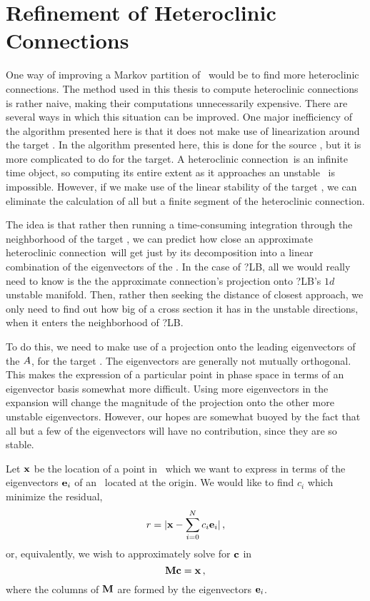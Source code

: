 \section{Refinement of Heteroclinic Connections}
One way of improving a Markov partition of \statesp\ would be to find
more heteroclinic connections.  The method used in this thesis to compute heteroclinic connections
is rather naive, making their computations unnecessarily expensive.  There
are several ways in which this situation can be improved.  One major inefficiency of
the algorithm presented here is that it does not make use of linearization
around the target \eqv.  In the algorithm presented
here, this is done for the source \eqv, but it is more complicated to
do for the target.  A heteroclinic connection\ is an infinite time object, so computing
its entire extent as it approaches an unstable \eqv\ is impossible.  However, if we make use
of the linear stability of the target \eqv, we can eliminate the calculation
of all but a finite segment of the heteroclinic connection.

The idea is that rather then running a time-consuming integration through
the neighborhood of the target \eqv, we can predict how close an approximate heteroclinic connection\
will get just by its decomposition into a linear combination of the eigenvectors of the \eqv.
In the case of ?LB, all we would really need to know is the
the approximate connection's projection onto ?LB's $1d$ unstable manifold.
Then, rather then seeking the distance of closest approach, we only need to find out how big
of a cross section it has in the unstable directions, when it enters
the neighborhood of ?LB.

To do this, we need to make use of a projection onto the leading eigenvectors
of the {\stabmat} $A$, for the target \eqv.  The eigenvectors are generally
not mutually orthogonal.  This makes the expression of a particular point
in phase space in terms of an eigenvector basis somewhat more difficult.
Using more eigenvectors in the expansion will change the magnitude
of the projection onto the other more unstable eigenvectors.
However, our hopes are somewhat buoyed by the fact that all but a few
of the eigenvectors will have no contribution, since they are so stable.

Let ${\bf x}$ be the location of a point in \statesp\ which we want
to express in terms of the eigenvectors ${\bf e}_i$ of an \eqv\ located
at the origin.
We would like to find $c_i$ which minimize the residual,
\begin{equation}
 r = |{{\bf x} - \sum_{i=0}^N c_i {\bf e}_i}|\,,
\end{equation}
or, equivalently, we wish to approximately solve for ${\bf c}$ in
\begin{equation}
 {\bf M} {\bf c} = {\bf x}\,,
\label{e:eigproj}
\end{equation}
where the columns of ${\bf M}$ are formed by the eigenvectors ${\bf e}_i$.

